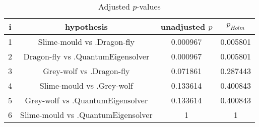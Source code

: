 \documentclass[a4paper,10pt]{article}
\begin{document}
\begin{landscape}
\begin{table}[!htp]
\centering\scriptsize
\begin{tabular}{cccc}
i&hypothesis&unadjusted $p$&$p_{Holm}$\\
\hline1&Slime-mould vs .Dragon-fly&0.000967&0.005801\\
2&Dragon-fly vs .QuantumEigensolver&0.000967&0.005801\\
3&Grey-wolf vs .Dragon-fly&0.071861&0.287443\\
4&Slime-mould vs .Grey-wolf&0.133614&0.400843\\
5&Grey-wolf vs .QuantumEigensolver&0.133614&0.400843\\
6&Slime-mould vs .QuantumEigensolver&1&1\\
\hline
\end{tabular}
\caption{Adjusted $p$-values}
\end{table}

\end{landscape}
\end{document}
